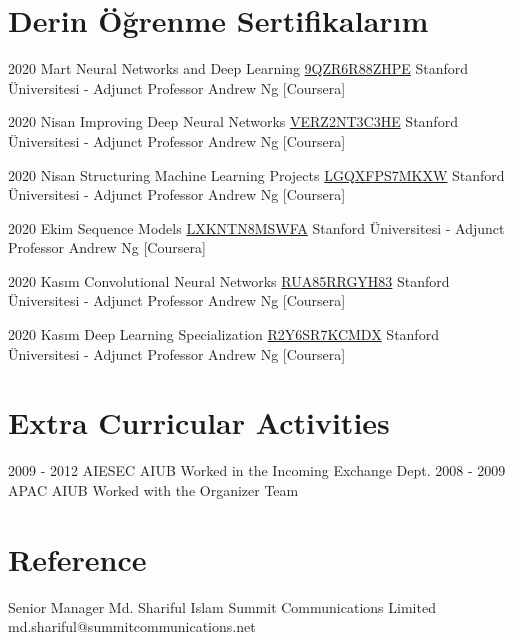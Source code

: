 \documentclass[]{cv-style} %
\begin{document}
\section{Derin Öğrenme Sertifikalarım}
\begin{entrylist}

    \entry
    {2020 Mart}
    {Neural Networks and Deep Learning}
    {\href{https://www.coursera.org/account/accomplishments/verify/9QZR6R88ZHPE}{9QZR6R88ZHPE}}
    {Stanford Üniversitesi - Adjunct Professor Andrew Ng [Coursera]}
    
    \entry
    {2020 Nisan}
    {Improving Deep Neural Networks}
    {\href{https://www.coursera.org/account/accomplishments/certificate/VERZ2NT3C3HE}{VERZ2NT3C3HE}}
    {Stanford Üniversitesi - Adjunct Professor Andrew Ng [Coursera]}
    
    \entry
    {2020 Nisan}
    {Structuring Machine Learning Projects}
    {\href{https://www.coursera.org/account/accomplishments/certificate/LGQXFPS7MKXW}{LGQXFPS7MKXW}}
    {Stanford Üniversitesi - Adjunct Professor Andrew Ng [Coursera]}
    
    \entry
    {2020 Ekim}
    {Sequence Models}
    {\href{https://www.coursera.org/account/accomplishments/certificate/LXKNTN8MSWFA}{LXKNTN8MSWFA}}
    {Stanford Üniversitesi - Adjunct Professor Andrew Ng [Coursera]}
    
    \entry
    {2020 Kasım}
    {Convolutional Neural Networks}
    {\href{https://www.coursera.org/account/accomplishments/certificate/RUA85RRGYH83}{RUA85RRGYH83}}
    {Stanford Üniversitesi - Adjunct Professor Andrew Ng [Coursera]}
    
    \entry
    {2020 Kasım}
    {Deep Learning Specialization}
    {\href{https://www.coursera.org/account/accomplishments/specialization/certificate/R2Y6SR7KCMDX}{R2Y6SR7KCMDX}}
    {Stanford Üniversitesi - Adjunct Professor Andrew Ng [Coursera]}
    
\end{entrylist}
\section{Extra Curricular Activities}
\begin{entrylist}
\entry
{2009 - 2012}
{AIESEC}
{AIUB}
{Worked in the Incoming Exchange Dept.}
\entry
{2008 - 2009}
{APAC}
{AIUB}
{Worked with the Organizer Team}
\end{entrylist}
\section{Reference}
\begin{entrylist}
\entry
{Senior Manager}
{Md. Shariful Islam}
{Summit Communications Limited}
{md.shariful@summitcommunications.net}
\end{entrylist}
\end{document}
